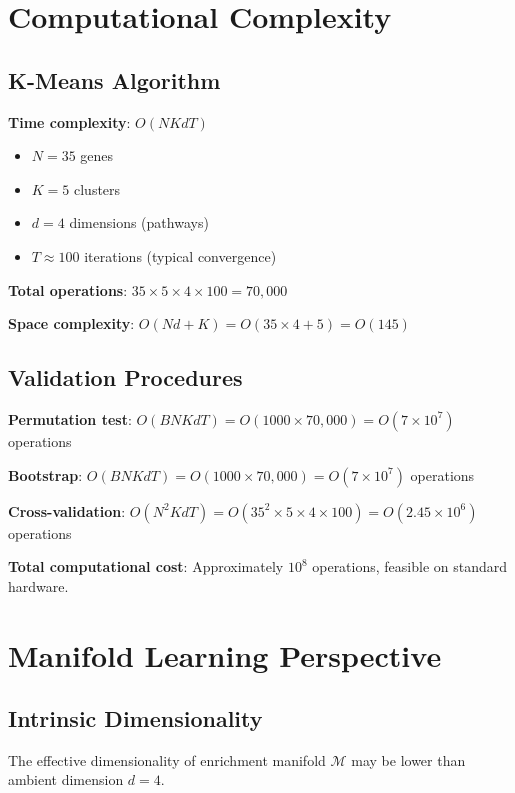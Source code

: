 \documentclass[12pt,letterpaper]{article}
\theoremstyle{definition}
\theoremstyle{remark}
\begin{document}
\section{Computational Complexity}

\subsection{K-Means Algorithm}

\textbf{Time complexity}: $O(NKdT)$
\begin{itemize}
    \item $N = 35$ genes
    \item $K = 5$ clusters
    \item $d = 4$ dimensions (pathways)
    \item $T \approx 100$ iterations (typical convergence)
\end{itemize}

\textbf{Total operations}: $35 \times 5 \times 4 \times 100 = 70,000$

\textbf{Space complexity}: $O(Nd + K) = O(35 \times 4 + 5) = O(145)$

\subsection{Validation Procedures}

\textbf{Permutation test}: $O(BNKdT) = O(1000 \times 70,000) = O(7 \times 10^7)$ operations

\textbf{Bootstrap}: $O(BNKdT) = O(1000 \times 70,000) = O(7 \times 10^7)$ operations

\textbf{Cross-validation}: $O(N^2KdT) = O(35^2 \times 5 \times 4 \times 100) = O(2.45 \times 10^6)$ operations

\textbf{Total computational cost}: Approximately $10^8$ operations, feasible on standard hardware.

\section{Manifold Learning Perspective}

\subsection{Intrinsic Dimensionality}

The effective dimensionality of enrichment manifold $\mathcal{M}$ may be lower than ambient dimension $d=4$.
\end{document}
